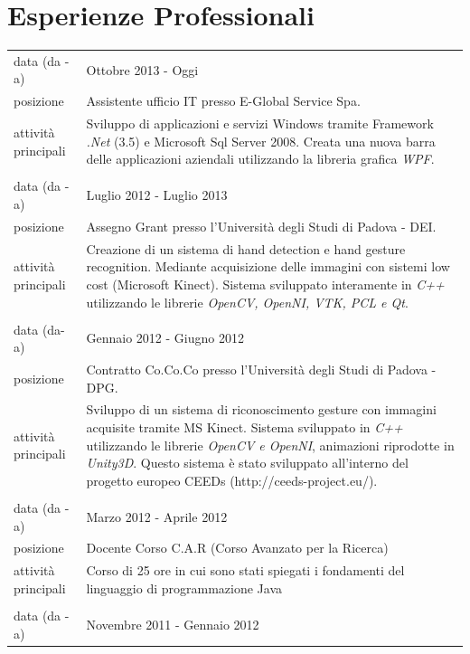 \documentclass[pdftex,a4paper,10pt,twoside,titlepage,italian]{article}
\begin{document}
\section*{Esperienze Professionali}
\begin{longtable}[h]{l p{}}
\footnotesize{data (da - a)} & Ottobre 2013 - Oggi \\
\footnotesize{posizione} & Assistente ufficio IT presso E-Global Service Spa.\\
\footnotesize{attività principali}& Sviluppo di applicazioni e servizi Windows tramite Framework \textit{.Net} (3.5) e 
Microsoft Sql Server 2008. Creata una nuova barra delle applicazioni aziendali utilizzando la libreria grafica \textit{WPF}.\\
& \\
\footnotesize{data (da - a)} & Luglio 2012 - Luglio 2013 \\
\footnotesize{posizione} & Assegno Grant presso l'Università degli Studi di Padova - DEI.\\
\footnotesize{attività principali}& Creazione di un sistema di hand detection e hand gesture recognition.
Mediante acquisizione delle immagini con sistemi low cost (Microsoft Kinect). Sistema sviluppato interamente in 
\textit{C++} utilizzando le librerie \textit{OpenCV, OpenNI, VTK, PCL e Qt}.\\
 & \\
\footnotesize{data (da-a)} & Gennaio 2012 - Giugno 2012 \\
\footnotesize{posizione}& Contratto Co.Co.Co presso  l'Università degli Studi di Padova - DPG.\\
\footnotesize{attività principali} & Sviluppo di un sistema di riconoscimento gesture con immagini 
acquisite tramite MS Kinect. Sistema sviluppato 
 			in \textit{C++} utilizzando le librerie \textit{OpenCV e OpenNI}, animazioni riprodotte in \textit{Unity3D}. 
Questo sistema è stato sviluppato all'interno del progetto europeo CEEDs (http://ceeds-project.eu/).\\
& \\
\footnotesize{data (da - a)} & Marzo 2012 - Aprile 2012\\
\footnotesize{posizione} & Docente Corso C.A.R (Corso Avanzato per la Ricerca)\\
\footnotesize{attività principali} & Corso di 25 ore in cui sono stati spiegati i fondamenti del linguaggio di programmazione Java\\
& \\
\footnotesize{data (da - a)} & Novembre 2011 - Gennaio 2012 \\

\end{longtable}
\end{document}
